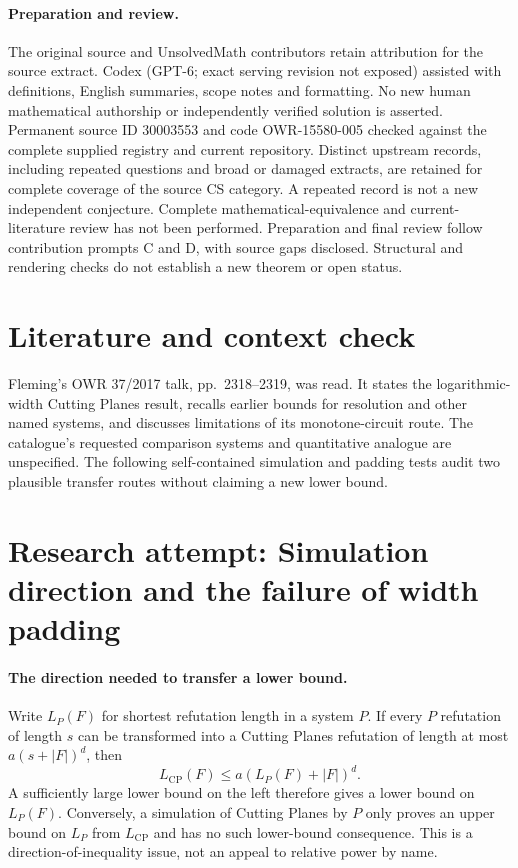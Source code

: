 \documentclass[11pt]{article}
\begin{document}
\paragraph{Preparation and review.}
The original source and UnsolvedMath contributors retain attribution for the source extract. Codex (GPT-6; exact serving revision not exposed) assisted with definitions, English summaries, scope notes and formatting. No new human mathematical authorship or independently verified solution is asserted. Permanent source ID 30003553 and code OWR-15580-005 checked against the complete supplied registry and current repository. Distinct upstream records, including repeated questions and broad or damaged extracts, are retained for complete coverage of the source CS category. A repeated record is not a new independent conjecture. Complete mathematical-equivalence and current-literature review has not been performed. Preparation and final review follow contribution prompts C and D, with source gaps disclosed. Structural and rendering checks do not establish a new theorem or open status.
\label{end:30003553}

\section{Literature and context check}
Fleming's OWR 37/2017 talk, pp.~2318--2319, was read. It states the logarithmic-width Cutting Planes result, recalls earlier bounds for resolution and other named systems, and discusses limitations of its monotone-circuit route. The catalogue's requested comparison systems and quantitative analogue are unspecified. The following self-contained simulation and padding tests audit two plausible transfer routes without claiming a new lower bound.
\section{Research attempt: Simulation direction and the failure of width padding}

\paragraph{The direction needed to transfer a lower bound.}
Write $L_P(F)$ for shortest refutation length in a system $P$. If every $P$ refutation of length $s$ can be transformed into a Cutting Planes refutation of length at most $a(s+|F|)^d$, then
\[
 L_{\mathrm{CP}}(F)\le a(L_P(F)+|F|)^d.
\]
A sufficiently large lower bound on the left therefore gives a lower bound on $L_P(F)$. Conversely, a simulation of Cutting Planes by $P$ only proves an upper bound on $L_P$ from $L_{\mathrm{CP}}$ and has no such lower-bound consequence. This is a direction-of-inequality issue, not an appeal to relative power by name.
\end{document}
